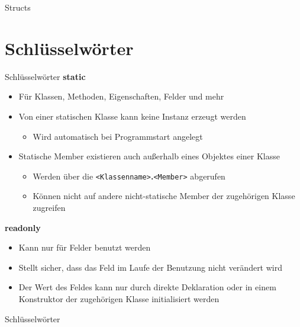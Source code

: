 \begin{frame}{Structs}
	
	
\end{frame}

\section{Schlüsselwörter}
\begin{frame}{Schlüsselwörter}
	\textbf{static}\\
	\begin{itemize}
		\item Für Klassen, Methoden, Eigenschaften, Felder und mehr
		\item Von einer statischen Klasse kann keine Instanz erzeugt werden
		\begin{itemize}
			\item Wird automatisch bei Programmstart angelegt
		\end{itemize}
		\item Statische Member existieren auch außerhalb eines Objektes einer Klasse 
		\begin{itemize}
			\item Werden über die \texttt{\alert{<Klassenname>}}\textbf{.}\texttt{\alert{<Member>}} abgerufen
			\item Können nicht auf andere nicht-statische Member der zugehörigen Klasse zugreifen
		\end{itemize}
	\end{itemize}
	\textbf{readonly}\\
	\begin{itemize}
		\item Kann nur für Felder benutzt werden
		\item Stellt sicher, dass das Feld im Laufe der Benutzung nicht verändert wird
		\item Der Wert des Feldes kann nur durch direkte Deklaration oder in einem Konstruktor der zugehörigen Klasse initialisiert werden
	\end{itemize}
\end{frame}

\begin{frame}{Schlüsselwörter}
	
	
\end{frame}

